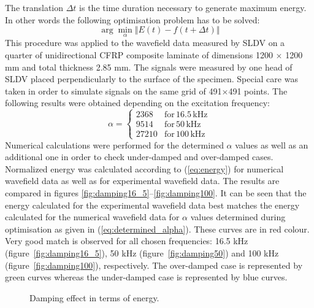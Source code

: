 \documentclass[12pt]{iopart}
\begin{document}
The translation \(\Delta t\) is the time duration necessary to generate maximum energy.
In other words the following optimisation problem has to be solved:
\begin{equation}
\arg \min_{\alpha}   \left\Vert E(t) - f(t+\Delta t) \right\Vert
\end{equation}
This procedure was applied to the wavefield data measured by SLDV on a quarter of unidirectional CFRP composite laminate of dimensions 1200 \(\times\) 1200 mm and total thickness 2.85 mm.
The signals were measured by one head of SLDV placed perpendicularly to the surface of the specimen.
Special care was taken in order to simulate signals on the same grid of 491\(\times\)491 points.
The following results were obtained depending on the excitation frequency:
\begin{equation}
\alpha =  \left \{
\begin{array}{rl}  
2368 & \mathrm{for\, 16.5\, kHz} \\[2pt]
9514 &\mathrm{for\, 50\, kHz}  \\[2pt]
27210 &\mathrm{for\, 100\, kHz} 
\end{array} \right.
\label{eq:determined_alpha}
\end{equation}
Numerical calculations were performed for the determined  \(\alpha\) values as well as an additional one in order to check under-damped and over-damped cases.
Normalized energy was calculated according to (\ref{eq:energy}) for numerical wavefield data as well as for experimental wavefield data.
The results are compared in figures \ref{fig:damping16_5}--\ref{fig:damping100}.
It can be seen that the energy calculated for the experimental wavefield data best matches the energy calculated for the numerical wavefield data for \(\alpha\) values determined during optimisation as given in (\ref{eq:determined_alpha}). 
These curves are in red colour.
Very good match is observed for all chosen frequencies: 16.5 kHz (figure~\ref{fig:damping16_5}), 50 kHz (figure~\ref{fig:damping50}) and 100 kHz (figure~\ref{fig:damping100}), respectively.
The over-damped case is represented by green curves whereas the under-damped case is represented by blue curves.
\begin{figure} [h!]
	\centering
	\hspace{0.1 cm} 	
		\hspace{0.1 cm} 	
	\caption{Damping effect in terms of energy.}
	\label{fig:damping}
\end{figure}
\end{document}
